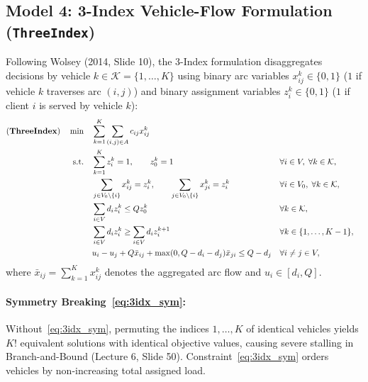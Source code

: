 \documentclass[11pt,a4paper]{article}
\begin{document}
\subsection{Model 4: 3-Index Vehicle-Flow Formulation (\texttt{ThreeIndex})}
Following Wolsey (2014, Slide 10), the 3-Index formulation disaggregates decisions by vehicle $k \in \mathcal{K} = \{1, \dots, K\}$ using binary arc variables $x_{ij}^k \in \{0, 1\}$ ($1$ if vehicle $k$ traverses arc $(i, j)$) and binary assignment variables $z_i^k \in \{0, 1\}$ ($1$ if client $i$ is served by vehicle $k$):
\begin{align}
\text{(\textbf{ThreeIndex})} \quad \min \quad & \sum_{k=1}^K \sum_{(i,j) \in A} c_{ij} x_{ij}^k \nonumber \\
\text{s.t.} \quad & \sum_{k=1}^K z_i^k = 1, \qquad z_0^k = 1 && \forall i \in V, \; \forall k \in \mathcal{K}, \label{eq:3idx_assign} \\
& \sum_{j \in V_0 \setminus \{i\}} x_{ij}^k = z_i^k, \qquad \sum_{j \in V_0 \setminus \{i\}} x_{ji}^k = z_i^k && \forall i \in V_0, \; \forall k \in \mathcal{K}, \label{eq:3idx_deg} \\
& \sum_{i \in V} d_i z_i^k \le Q z_0^k && \forall k \in \mathcal{K}, \label{eq:3idx_cap} \\
& \sum_{i \in V} d_i z_i^k \ge \sum_{i \in V} d_i z_i^{k+1} && \forall k \in \{1, \dots, K-1\}, \label{eq:3idx_sym} \\
& u_i - u_j + Q \bar{x}_{ij} + \max(0, Q - d_i - d_j)\bar{x}_{ji} \le Q - d_j && \forall i \neq j \in V, \label{eq:3idx_subtour}
\end{align}
where $\bar{x}_{ij} = \sum_{k=1}^K x_{ij}^k$ denotes the aggregated arc flow and $u_i \in [d_i, Q]$.
\paragraph{Symmetry Breaking~\eqref{eq:3idx_sym}:} Without~\eqref{eq:3idx_sym}, permuting the indices $1, \dots, K$ of identical vehicles yields $K!$ equivalent solutions with identical objective values, causing severe stalling in Branch-and-Bound (Lecture 6, Slide 50). Constraint~\eqref{eq:3idx_sym} orders vehicles by non-increasing total assigned load.
\end{document}

